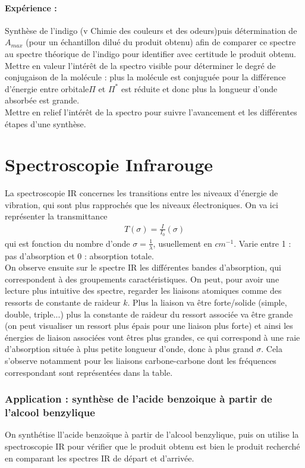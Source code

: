 \documentclass[12pt,prb,aps,epsf]{report}
\begin{document}
\paragraph{Expérience :} Synthèse de l'indigo (v Chimie des couleurs et des odeurs)puis détermination de $A_{max}$ (pour un échantillon dilué du produit obtenu) afin de comparer ce spectre au spectre théorique de l'indigo pour identifier avec certitude le produit obtenu.\\

Mettre en valeur l'intérêt de la spectro visible pour déterminer le degré de conjugaison de la molécule : plus la molécule est conjuguée pour la différence d'énergie entre orbitale$\Pi$ et $\Pi^*$ est réduite et donc plus la longueur d'onde absorbée est grande.\\

Mettre en relief l'intérêt de la spectro pour suivre l'avancement et les différentes étapes d'une synthèse.

\section{Spectroscopie Infrarouge}
La spectroscopie IR concernes les transitions entre les niveaux d'énergie de vibration, qui sont plus rapprochés que les niveaux électroniques. On va ici représenter la transmittance
\begin{eqnarray}
T(\sigma) =   \frac{I}{I_0}(\sigma)
\end{eqnarray}
qui est fonction du nombre d'onde $\sigma = \frac{1}{\lambda}$, usuellement en $cm^{-1}$. Varie entre 1 : pas d'absorption et 0 : absorption totale.\\
On observe ensuite sur le spectre IR les différentes bandes d'absorption, qui correspondent à des groupements caractéristiques. On peut, pour avoir une lecture plus intuitive des spectre, regarder les liaisons atomiques comme des ressorts de constante de raideur $k$. Plus la liaison va être forte/solide (simple, double, triple...) plus la constante de raideur du ressort associée va être grande (on peut visualiser un ressort plus épais pour une liaison plus forte) et ainsi les énergies de liaison associées vont êtres plus grandes, ce qui correspond à une raie d'absorption située à plus petite longueur d'onde, donc à plus grand $\sigma$. Cela s'observe notamment pour les liaisons carbone-carbone dont les fréquences correspondant sont représentées dans la table.

\subsubsection{Application : synthèse de l'acide benzoique à partir de l'alcool benzylique}
On synthétise ll'acide benzoïque à partir de l'alcool benzylique, puis on utilise la spectroscopie IR pour vérifier que le produit obtenu est bien le produit recherché en comparant les spectres IR de départ et d'arrivée.
\end{document}
